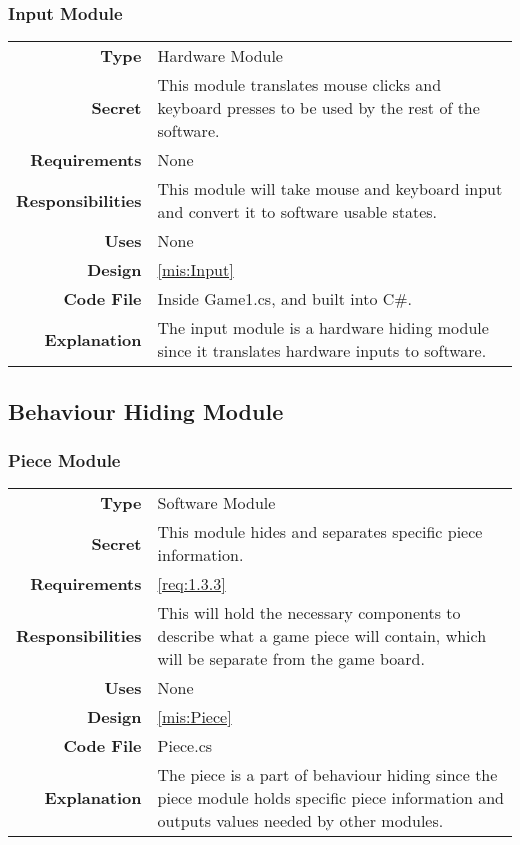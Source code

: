 \documentclass[10pt]{article}
\makeatletter
\newcommand{\CustomLabel}[1]{\Hy@raisedlink{\hypertarget{#1}{}}\label{#1}}
\makeatother
\begin{document}
    \subsubsection{Input Module}\CustomLabel{mod:Input}
    \begin{tabularx}{\linewidth}{ >{\bfseries}r X }
        Type            & Hardware Module \\
        Secret          & This module translates mouse clicks and keyboard presses to be used by the rest of the software. \\
        Requirements	& None \\
        Responsibilities & This module will take mouse and keyboard input and convert it to software usable states. \\
        Uses            & None \\
        Design          & \ref{mis:Input} \\
        Code File       & Inside Game1.cs, and built into C\#. \\
        Explanation     & The input module is a hardware hiding module since it translates hardware inputs to software. \\
    \end{tabularx}

\subsection{Behaviour Hiding Module}

    \subsubsection{Piece Module}\CustomLabel{mod:Piece}
        \begin{tabularx}{\linewidth}{ >{\bfseries}r X }
            Type            & Software Module \\
            Secret          & This module hides and separates specific piece information. \\
	        Requirements	& \ref{req:1.3.3} \\
            Responsibilities & This will hold the necessary components to describe what a game piece will contain, which will be separate from the game board. \\
            Uses            & None \\
            Design          & \ref{mis:Piece} \\
            Code File       & Piece.cs \\
            Explanation     & The piece is a part of behaviour hiding since the piece module holds specific piece information and outputs values needed by other modules. \\
        \end{tabularx}
\end{document}
